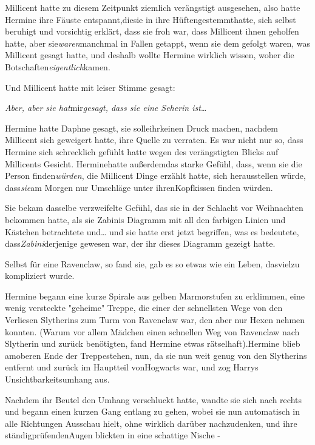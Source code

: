 {Millicent hatte zu diesem Zeitpunkt ziemlich verängstigt ausgesehen, also hatte Hermine ihre Fäuste entspannt,diesie in ihre Hüftengestemmthatte, sich selbst beruhigt und vorsichtig erklärt, dass sie froh war, dass Millicent ihnen geholfen hatte, aber sie\emph{waren}manchmal in Fallen getappt, wenn sie dem gefolgt waren, was Millicent gesagt hatte, und deshalb wollte Hermine wirklich wissen, woher die Botschaften\emph{eigentlich}kamen.

Und Millicent hatte mit leiser Stimme gesagt:

\emph{Aber, aber sie hat}mir\emph{gesagt, dass sie eine Seherin ist}…

Hermine hatte Daphne gesagt, sie solleihrkeinen Druck machen, nachdem Millicent sich geweigert hatte, ihre Quelle zu verraten. Es war nicht nur so, dass Hermine sich schrecklich gefühlt hatte wegen des verängstigten Blicks auf Millicents Gesicht. Herminehatte außerdemdas starke Gefühl, dass, wenn sie die Person finden\emph{würden}, die Millicent Dinge erzählt hatte, sich herausstellen würde, dass\emph{sie}am Morgen nur Umschläge unter ihrenKopfkissen finden würden.

Sie bekam dasselbe verzweifelte Gefühl, das sie in der Schlacht vor Weihnachten bekommen hatte, als sie Zabinis Diagramm mit all den farbigen Linien und Kästchen betrachtete und… und sie hatte erst jetzt begriffen, was es bedeutete, dass\emph{Zabini}derjenige gewesen war, der ihr dieses Diagramm gezeigt hatte.

Selbst für eine Ravenclaw, so fand sie, gab es so etwas wie ein Leben, dasvielzu kompliziert wurde.

Hermine begann eine kurze Spirale aus gelben Marmorstufen zu erklimmen, eine wenig versteckte "geheime" Treppe, die einer der schnellsten Wege von den Verliesen Slytherins zum Turm von Ravenclaw war, den aber nur Hexen nehmen konnten. (Warum vor allem Mädchen einen schnellen Weg von Ravenclaw nach Slytherin und zurück benötigten, fand Hermine etwas rätselhaft).Hermine blieb amoberen Ende der Treppestehen, nun, da sie nun weit genug von den Slytherins entfernt und zurück im Hauptteil vonHogwarts war, und zog Harrys Unsichtbarkeitsumhang aus.

Nachdem ihr Beutel den Umhang verschluckt hatte, wandte sie sich nach rechts und begann einen kurzen Gang entlang zu gehen, wobei sie nun automatisch in alle Richtungen Ausschau hielt, ohne wirklich darüber nachzudenken, und ihre ständigprüfendenAugen blickten in eine schattige Nische -

}
